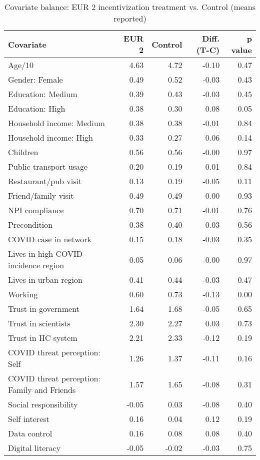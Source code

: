 \begin{table}[h!]
\centering
\caption{Covariate balance: EUR 2 incentivization treatment vs. Control (means reported)} 
\label{tab:eur2-balance}
\begingroup\footnotesize
\begin{tabular}{lrrrr}
  \hline
Covariate & EUR 2 & Control & Diff. (T-C) & p value \\ 
  \hline
Age/10 & 4.63 & 4.72 & -0.10 & 0.47 \\ 
  Gender: Female & 0.49 & 0.52 & -0.03 & 0.43 \\ 
  Education: Medium & 0.39 & 0.43 & -0.03 & 0.45 \\ 
  Education: High & 0.38 & 0.30 & 0.08 & 0.05 \\ 
  Household income: Medium & 0.38 & 0.38 & -0.01 & 0.84 \\ 
  Household income: High & 0.33 & 0.27 & 0.06 & 0.14 \\ 
  Children & 0.56 & 0.56 & -0.00 & 0.97 \\ 
  Public transport usage & 0.20 & 0.19 & 0.01 & 0.84 \\ 
  Restaurant/pub visit & 0.13 & 0.19 & -0.05 & 0.11 \\ 
  Friend/family visit & 0.49 & 0.49 & 0.00 & 0.93 \\ 
  NPI compliance & 0.70 & 0.71 & -0.01 & 0.76 \\ 
  Precondition & 0.38 & 0.40 & -0.03 & 0.56 \\ 
  COVID case in network & 0.15 & 0.18 & -0.03 & 0.35 \\ 
  Lives in high COVID incidence region & 0.05 & 0.06 & -0.00 & 0.97 \\ 
  Lives in urban region & 0.41 & 0.44 & -0.03 & 0.47 \\ 
  Working & 0.60 & 0.73 & -0.13 & 0.00 \\ 
  Trust in government & 1.64 & 1.68 & -0.05 & 0.65 \\ 
  Trust in scientists & 2.30 & 2.27 & 0.03 & 0.73 \\ 
  Trust in HC system & 2.21 & 2.33 & -0.12 & 0.19 \\ 
  COVID threat perception: Self & 1.26 & 1.37 & -0.11 & 0.16 \\ 
  COVID threat perception: Family and Friends & 1.57 & 1.65 & -0.08 & 0.31 \\ 
  Social responsibility & -0.05 & 0.03 & -0.08 & 0.40 \\ 
  Self interest & 0.16 & 0.04 & 0.12 & 0.19 \\ 
  Data control & 0.16 & 0.08 & 0.08 & 0.40 \\ 
  Digital literacy & -0.05 & -0.02 & -0.03 & 0.75 \\ 
   \hline
\end{tabular}
\endgroup
\end{table}
